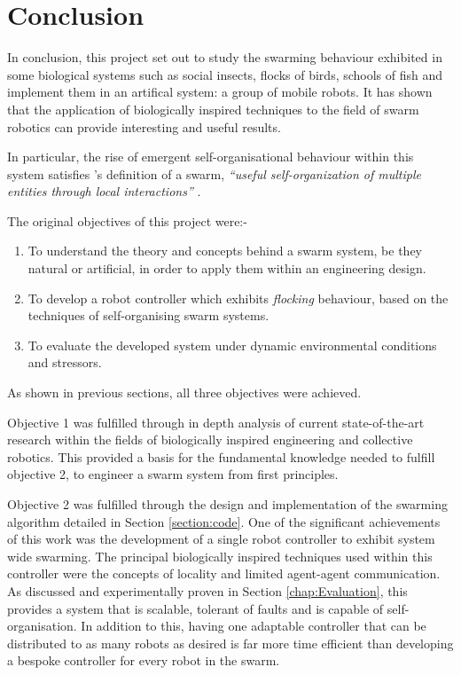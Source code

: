 
\chapter{Conclusion}
\label{chap:Conclusion}

In conclusion, this project set out to study the swarming behaviour exhibited in some biological systems such as social insects, flocks of birds, schools of fish and implement them in an artifical system: a group of mobile robots. It has shown that the application of biologically inspired techniques to the field of swarm robotics can provide interesting and useful results. 

In particular, the rise of emergent self-organisational behaviour within this system satisfies \citeauthor{VanDykeParunak2004}'s definition of a swarm, \textit{``useful self-organization of multiple entities through local interactions''} \cite{VanDykeParunak2004}.

The original objectives of this project were:-

\begin{enumerate}
	\item To understand the theory and concepts behind a swarm system, be they natural or artificial, in order to apply them within an engineering design.
	\item To develop a robot controller which exhibits \textit{flocking} behaviour, based on the techniques of self-organising swarm systems.
	\item To evaluate the developed system under dynamic environmental conditions and stressors.
\end{enumerate}

As shown in previous sections, all three objectives were achieved. 

Objective 1 was fulfilled through in depth analysis of current state-of-the-art research within the fields of biologically inspired engineering and collective robotics. This provided a basis for the fundamental knowledge needed to fulfill objective 2, to engineer a swarm system from first principles. 

Objective 2 was fulfilled through the design and implementation of the swarming algorithm detailed in Section \ref{section:code}. One of the significant achievements of this work was the development of a single robot controller to exhibit system wide swarming. The principal biologically inspired techniques used within this controller were the concepts of locality and limited agent-agent communication. As discussed and experimentally proven in Section \ref{chap:Evaluation}, this provides a system that is scalable, tolerant of faults and is capable of self-organisation. In addition to this, having one adaptable controller that can be distributed to as many robots as desired is far more time efficient than developing a bespoke controller for every robot in the swarm.

